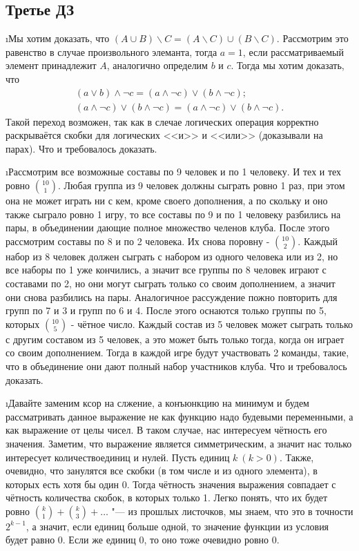 \subsection{Третье ДЗ}

\i Мы хотим доказать, что $(A \cup B) \backslash C = (A \backslash C) \cup (B \backslash C)$. Рассмотрим это равенство в случае произвольного элеманта, тогда $a = 1$, если рассматриваемый элемент принадлежит $A$, аналогично определим $b$ и $c$. Тогда мы хотим доказать, что 
\begin{gather*}
    (a \vee b) \wedge \neg c = (a \wedge \neg c) \vee (b \wedge \neg c);\\
    (a \wedge \neg c) \vee (b \wedge \neg c) = (a \wedge \neg c) \vee (b \wedge \neg c).
\end{gather*}
Такой переход возможен, так как в слечае логических операция корректно раскрываётся скобки для логических <<и>> и <<или>> (доказывали на парах). Что и требовалось доказать.

\i Рассмотрим все возможные составы по 9 человек и по 1 человеку. И тех и тех ровно $\binom{10}{1}$. Любая группа из 9 человек должны сыграть ровно 1 раз, при этом она не может играть ни с кем, кроме своего дополнения, а по скольку и оно также сыграло ровно 1 игру, то все составы по 9 и по 1 человеку разбились на пары, в объединении дающие полное множество челенов клуба. После этого рассмотрим составы по 8 и по 2 человека. Их снова поровну - $\binom{10}{2}$. Каждый набор из 8 человек должен сыграть с набором из одного человека или из 2, но все наборы по 1 уже кончились, а значит все группы по 8 человек играют с составами по 2, но они могут сыграть только со своим дополнением, а значит они снова разбились на пары. Аналогичное рассуждение пожно повторить для групп по 7 и 3 и групп по 6 и 4. После этого оснаются только группы по 5, которых $\binom{10}{5}$ - чётное число. Каждый состав из 5 человек может сыграть только с другим составом из 5 человек, а это может быть только тогда, когда он играет со своим дополнением. Тогда в каждой игре будут участвовать 2 команды, такие, что в объединение они дают полный набор участников клуба. Что и требовалось доказать.

\i Давайте заменим ксор на слжение, а конъюнкцию на минимум и будем рассматривать данное выражение не как функцию надо будевыми переменными, а как выражение от целы чисел. В таком случае, нас интересуем чётность его значения. Заметим, что выражение является симметрическим, а значит нас только интересует количествоединиц и нулей. Пусть единиц $k \ (k > 0)$. Также, очевидно, что занулятся все скобки (в том числе и из одного элемента), в которых есть хотя бы один 0. Тогда чётность значения выражения совпадает с чётность количества скобок, в которых только 1. Легко понять, что их будет ровно $\binom{k}{1} + \binom{k}{3} + \ldots$ "--- из прошлых листочков, мы знаем, что это в точности $2^{k-1}$, а значит, если единиц больше одной, то значение функции из условия будет равно 0. Если же единиц 0, то оно тоже очевидно ровно 0.

